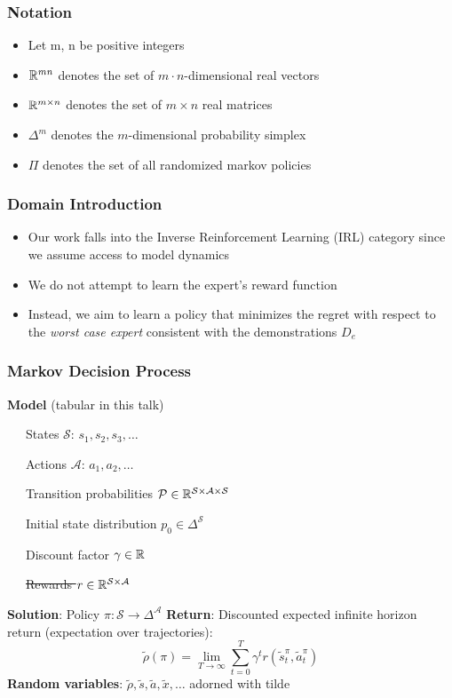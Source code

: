 \documentclass{beamer}
\begin{document}
\begin{frame}
	\frametitle{Notation}
	\begin{itemize}
		\item Let m, n be positive integers
		\item $\mathbb{R}^{mn}$ denotes the set of $m \cdot n$-dimensional real vectors
		\item $\mathbb{R}^{m \times n}$ denotes the set of $m \times n$ real matrices
		\item $\Delta^m$ denotes the $m$-dimensional probability simplex
		\item $\Pi$ denotes the set of all randomized markov policies
	\end{itemize}
\end{frame}

\begin{frame}
\frametitle{Domain Introduction}
	\begin{itemize}
		\item Our work falls into the Inverse Reinforcement Learning (IRL) category since we assume access to model dynamics
		\item We do not attempt to learn the expert's reward function
		\item Instead, we aim to learn a policy that minimizes the regret with respect to the \emph{worst case expert} consistent with the demonstrations $D_e$
	\end{itemize}
\end{frame}

\begin{frame} \frametitle{Markov Decision Process}
  \textbf{Model} (tabular in this talk) \par
    {\small
   ~~~States $\mathcal{S}$: $s_1, s_2, s_3, \dots $ \par
   ~~~Actions $\mathcal{A}$: $a_1, a_2, \dots $ \par
   ~~~Transition probabilities $\mathcal{P} \in \mathbb{R}^{\mathcal{S} \times \mathcal{A} \times \mathcal{S} }$ \par
   ~~~Initial state distribution $p_0 \in \Delta^\mathcal{S}$ \par
   ~~~Discount factor $\gamma \in \mathbb{R}$ \par
   ~~~\sout{Rewards $r \in \mathbb{R}^{\mathcal{S} \times \mathcal{A}}$}}
    \vfill 
    \textbf{Solution}: Policy ${\pi}\colon \mathcal{S} \to \Delta^\mathcal{A}$
    \vfill
    \textbf{Return}: Discounted expected infinite horizon return (expectation over trajectories):
    \[
	    \tilde{\rho}(\pi) = \lim_{T \to \infty} \sum_{t=0}^T \gamma^t r(\tilde{s}^{\pi}_t, \tilde{a}^{{\pi}}_t)
    \]
    \vfill
    \textbf{Random variables}: $\tilde{\rho}, \tilde{s}, \tilde{a}, \tilde{x}, \dots $ adorned with tilde
\end{frame}
\end{document}
